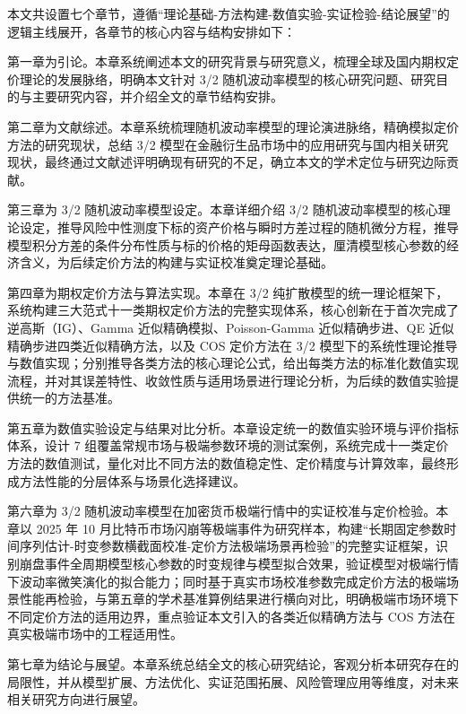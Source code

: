 本文共设置七个章节，遵循“理论基础-方法构建-数值实验-实证检验-结论展望”的逻辑主线展开，各章节的核心内容与结构安排如下：

第一章为引论。本章系统阐述本文的研究背景与研究意义，梳理全球及国内期权定价理论的发展脉络，明确本文针对 3/2 随机波动率模型的核心研究问题、研究目的与主要研究内容，并介绍全文的章节结构安排。

第二章为文献综述。本章系统梳理随机波动率模型的理论演进脉络，精确模拟定价方法的研究现状，总结 3/2 模型在金融衍生品市场中的应用研究与国内相关研究现状，最终通过文献述评明确现有研究的不足，确立本文的学术定位与研究边际贡献。

第三章为 3/2 随机波动率模型设定。本章详细介绍 3/2 随机波动率模型的核心理论设定，推导风险中性测度下标的资产价格与瞬时方差过程的随机微分方程，推导模型积分方差的条件分布性质与标的价格的矩母函数表达，厘清模型核心参数的经济含义，为后续定价方法的构建与实证校准奠定理论基础。

第四章为期权定价方法与算法实现。本章在 3/2 纯扩散模型的统一理论框架下，系统构建三大范式十一类期权定价方法的完整实现体系，核心创新在于首次完成了逆高斯（IG）、Gamma 近似精确模拟、Poisson-Gamma 近似精确步进、QE 近似精确步进四类近似精确方法，以及 COS 定价方法在 3/2 模型下的系统性理论推导与数值实现；分别推导各类方法的核心理论公式，给出每类方法的标准化数值实现流程，并对其误差特性、收敛性质与适用场景进行理论分析，为后续的数值实验提供统一的方法基准。

第五章为数值实验设定与结果对比分析。本章设定统一的数值实验环境与评价指标体系，设计 7 组覆盖常规市场与极端参数环境的测试案例，系统完成十一类定价方法的数值测试，量化对比不同方法的数值稳定性、定价精度与计算效率，最终形成方法性能的分层体系与场景化选择建议。

第六章为 3/2 随机波动率模型在加密货币极端行情中的实证校准与定价检验。本章以 2025 年 10 月比特币市场闪崩等极端事件为研究样本，构建“长期固定参数时间序列估计-时变参数横截面校准-定价方法极端场景再检验”的完整实证框架，识别崩盘事件全周期模型核心参数的时变规律与模型拟合效果，验证模型对极端行情下波动率微笑演化的拟合能力；同时基于真实市场校准参数完成定价方法的极端场景性能再检验，与第五章的学术基准算例结果进行横向对比，明确极端市场环境下不同定价方法的适用边界，重点验证本文引入的各类近似精确方法与 COS 方法在真实极端市场中的工程适用性。

第七章为结论与展望。本章系统总结全文的核心研究结论，客观分析本研究存在的局限性，并从模型扩展、方法优化、实证范围拓展、风险管理应用等维度，对未来相关研究方向进行展望。